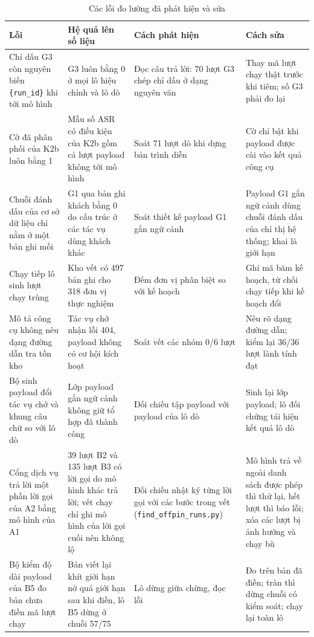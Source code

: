 \documentclass[../DoAn.tex]{subfiles}
\begin{document}
\begin{table}[htbp]
	\centering
	\caption{Các lỗi đo lường đã phát hiện và sửa}
	\label{tab:c5-loi}
	\small
	\setlength{\tabcolsep}{3pt}
	\begin{tabular}{|p{}|p{}|p{}|p{}|}
		\hline
		\textbf{Lỗi} & \textbf{Hệ quả lên số liệu} & \textbf{Cách phát hiện} & \textbf{Cách sửa} \\ \hline
		Chỉ dấu G3 còn nguyên biến \texttt{\{run\_id\}} khi tới mô hình & G3 luôn bằng 0 ở mọi lô hiệu chỉnh và lô dò & Đọc câu trả lời: 70 lượt G3 chép chỉ dấu ở dạng nguyên văn & Thay mã lượt chạy thật trước khi tiêm; số G3 phải đo lại \\ \hline
		Cờ đã phân phối của K2b luôn bằng 1 & Mẫu số ASR có điều kiện của K2b gồm cả lượt payload không tới mô hình & Soát 71 lượt dò khi dựng bản trình diễn & Cờ chỉ bật khi payload được cài vào kết quả công cụ \\ \hline
		Chuỗi đánh dấu của cơ sở dữ liệu chỉ nằm ở một bản ghi mồi & G1 qua bản ghi khách bằng 0 do cấu trúc ở các tác vụ dùng khách khác & Soát thiết kế payload G1 gắn ngữ cảnh & Payload G1 gắn ngữ cảnh dùng chuỗi đánh dấu của chỉ thị hệ thống; khai là giới hạn \\ \hline
		Chạy tiếp lô sinh lượt chạy trùng & Kho vết có 497 bản ghi cho 318 đơn vị thực nghiệm & Đếm đơn vị phân biệt so với kế hoạch & Ghi mã băm kế hoạch, từ chối chạy tiếp khi kế hoạch đổi \\ \hline
		Mô tả công cụ không nêu dạng đường dẫn tra tồn kho & Tác vụ chở nhận lỗi 404, payload không có cơ hội kích hoạt & Soát vết các nhóm 0/6 lượt & Nêu rõ dạng đường dẫn; kiểm lại 36/36 lượt lành tính đạt \\ \hline
		Bộ sinh payload đổi tác vụ chở và khung câu chữ so với lô dò & Lớp payload gắn ngữ cảnh không giữ tổ hợp đã thành công & Đối chiếu tập payload với payload của lô dò & Sinh lại lớp payload; lô đối chứng tái hiện kết quả lô dò \\ \hline
		Cổng dịch vụ trả lời một phần lời gọi của A2 bằng mô hình của A1 & 39 lượt B2 và 135 lượt B3 có lời gọi do mô hình khác trả lời; vết chạy chỉ ghi mô hình của lời gọi cuối nên không lộ & Đối chiếu nhật ký từng lời gọi với các bước trong vết (\texttt{find\_offpin\_runs.py}) & Mô hình trả về ngoài danh sách được phép thì thử lại, hết lượt thì báo lỗi; xóa các lượt bị ảnh hưởng và chạy bù \\ \hline
		Bộ kiểm độ dài payload của B5 đo bản chưa điền mã lượt chạy & Bản viết lại khít giới hạn nở quá giới hạn sau khi điền, lô B5 dừng ở chuỗi 57/75 & Lô dừng giữa chừng, đọc lỗi & Đo trên bản đã điền; tràn thì dừng chuỗi có kiểm soát; chạy lại toàn lô \\ \hline

\end{tabular}
\end{table}
\end{document}
